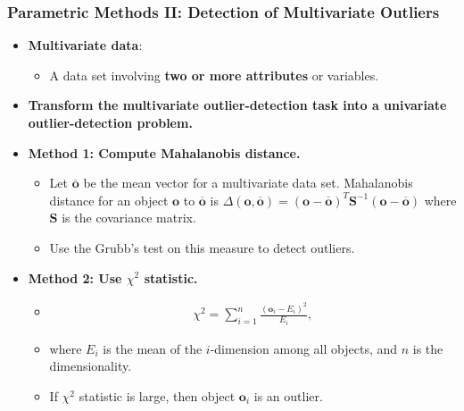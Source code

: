 \begin{frame}
  \frametitle{Parametric Methods II: Detection of Multivariate Outliers}
  \begin{itemize}
  \item \textbf{Multivariate data}:
    \begin{itemize}
    \item A data set involving \textbf{\color{airforceblue}two or more attributes} or variables.
    \end{itemize}
  \item \textbf{Transform the multivariate outlier-detection task into a univariate outlier-detection problem.}
  \item \textbf{Method 1: Compute Mahalanobis distance.}
    \begin{itemize}
    \item Let $\mathbf{\overline{o}}$ be the mean vector for a multivariate data set. Mahalanobis distance for an object $\mathbf{o}$ to $\mathbf{\overline{o}}$ is $\Delta(\mathbf{o}, \mathbf{\overline{o}}) = (\mathbf{o} - \mathbf{\overline{o}})^T \mathbf{S}^{-1} (\mathbf{o} - \mathbf{\overline{o}})$ where $\mathbf{S}$ is the covariance matrix.
    \item Use the Grubb's test on this measure to detect outliers.
    \end{itemize}
  \item \textbf{Method 2: Use $\chi^2$ statistic.}
    \begin{itemize}
    \item \vspace{-0.5cm}
      \begin{align}
        \chi^2 = \sum^n_{i=1} \frac{(\mathbf{o}_i-E_i)^2}{E_i},
      \end{align}
    \item where $E_i$ is the mean of the $i$-dimension among all objects, and $n$ is the dimensionality.
    \item If $\chi^2$ statistic is large, then object $\mathbf{o}_i$ is an outlier.
    \end{itemize}
  \end{itemize}
\end{frame}


